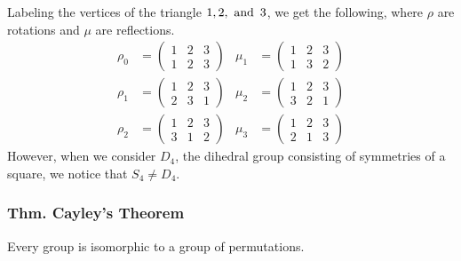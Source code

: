 Labeling the vertices of the triangle $1,2, \operatorname{~\text{and}~} 3$, we get the following, where $\rho$ are rotations and $\mu$ are reflections.
\begin{align*}
    \rho_0 & = \begin{pmatrix}
        1 & 2 & 3 \\
        1 & 2 & 3
    \end{pmatrix} & \mu_1 & = \begin{pmatrix}
        1 & 2 & 3 \\
        1 & 3 & 2
    \end{pmatrix} \\
    \rho_1 & = \begin{pmatrix}
        1 & 2 & 3 \\
        2 & 3 & 1
    \end{pmatrix} & \mu_2 & = \begin{pmatrix}
        1 & 2 & 3 \\
        3 & 2 & 1
    \end{pmatrix} \\
    \rho_2 & = \begin{pmatrix}
        1 & 2 & 3 \\
        3 & 1 & 2
    \end{pmatrix} & \mu_3 & = \begin{pmatrix}
        1 & 2 & 3 \\
        2 & 1 & 3
    \end{pmatrix}
\end{align*}
However, when we consider $D_4$, the dihedral group consisting of symmetries of a square, we notice that $S_4 \neq D_4$.

\subsubsection{Thm. Cayley's Theorem}
Every group is isomorphic to a group of permutations.

